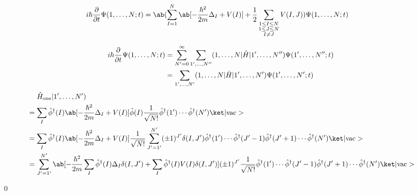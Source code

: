 \documentclass[uplatex,dvipdfmx,a4paper,11pt]{jlreq}
\makeatletter
\numberwithin{equation}{section}
\theoremstyle{definition}
\renewenvironment{proof}[1][\proofname]{\par
  \normalfont
  \topsep6\p@\@plus6\p@ \trivlist
  \item[\hskip\labelsep{\bfseries #1}\@addpunct{\bfseries}]\ignorespaces\quad\par
}{
  \qed\endtrivlist\@endpefalse
}
\renewcommand\proofname{証明}
\makeatother
\begin{document}
\begin{theorem}
  \begin{align}
    i\hbar\diffp{}{t}\Psi(1,\ldots,N; t) & = \ab(\sum_{I = 1}^{N}\ab[-\frac{\hbar^2}{2m}\Delta_I + V(I)] + \frac{1}{2}\sum_{\substack{1\leq I\leq N \\ 1\leq J\leq N \\ I \neq J}}V(I, J))\Psi(1,\ldots,N; t)
  \end{align}
\end{theorem}
\begin{proof}
  \begin{align}
    i\hbar\diffp{}{t}\Psi(1,\ldots,N; t) & = \sum_{N' = 0}^{\infty}\sum_{1',\ldots,N''}(1,\ldots,N|\hat{H}|1',\ldots,N'')\Psi(1',\ldots,N''; t) \\
                                         & = \sum_{1',\ldots,N'}(1,\ldots,N|\hat{H}|1',\ldots,N')\Psi(1',\ldots,N'; t)
  \end{align}
  \begin{align}
     & \quad\ \hat{H}_{\mathrm{one}}|1',\ldots,N')                                                                                                                                                                                                                                                               \\
     & = \sum_{I}\hat{\phi}^\dagger(I)\ab[-\frac{\hbar^2}{2m}\Delta_I + V(I)]\hat{\phi}(I)\frac{1}{\sqrt{N!}}\hat{\phi}^\dagger(1')\cdots\hat{\phi}^\dagger(N')\ket|\mathrm{vac}>                                                                                                                                \\
     & = \sum_{I}\hat{\phi}^\dagger(I)\ab[-\frac{\hbar^2}{2m}\Delta_I + V(I)]\frac{1}{\sqrt{N!}}\sum_{J' = 1'}^{N'}(\pm 1)^{J'}\delta(I, J')\hat{\phi}^\dagger(1')\cdots\hat{\phi}^\dagger(J'-1)\hat{\phi}^\dagger(J'+1)\cdots\hat{\phi}^\dagger(N')\ket|\mathrm{vac}>                                           \\
     & = \sum_{J' = 1'}^{N'}\ab[-\frac{\hbar^2}{2m}\sum_{I}\hat{\phi}^\dagger(I)\Delta_I\delta(I, J') + \sum_{I}\hat{\phi}^\dagger(I)V(I)\delta(I, J')](\pm 1)^{J'}\frac{1}{\sqrt{N!}}\hat{\phi}^\dagger(1')\cdots\hat{\phi}^\dagger(J'-1)\hat{\phi}^\dagger(J'+1)\cdots\hat{\phi}^\dagger(N')\ket|\mathrm{vac}> \\

\end{align}
\end{proof}
\end{document}
